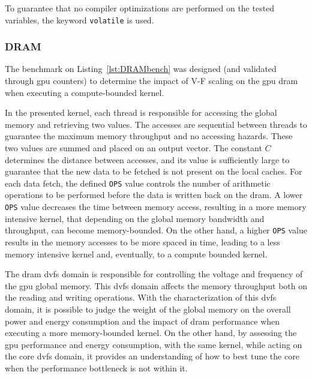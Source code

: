 To guarantee that no compiler optimizations are performed on the tested variables, the keyword \texttt{volatile} is used.


\subsubsection{DRAM}
\label{sec:DRAMbench_exp}

The benchmark on Listing~\ref{lst:DRAMbench} was designed (and validated through \acrshort{gpu} counters) to determine the impact of V-F scaling on the \acrshort{gpu} \acrshort{dram} when executing a compute-bounded kernel.

In the presented kernel, each thread is responsible for accessing the global memory and retrieving two values. The accesses are sequential between threads to guarantee the maximum memory throughput and no accessing hazards. 
These two values are summed and placed on an output vector. The constant $C$ determines the distance between accesses, and its value is sufficiently large to guarantee that the new data to be fetched is not present on the local caches.
For each data fetch, the defined \texttt{OPS} value controls the number of arithmetic operations to be performed before the data is written back on the \acrshort{dram}. A lower \texttt{OPS} value decreases the time between memory access, resulting in a more memory intensive kernel, that depending on the global memory bandwidth and throughput, can become memory-bounded. On the other hand, a higher \texttt{OPS} value results in the memory accesses to be more spaced in time, leading to a less memory intensive kernel and, eventually, to a compute bounded kernel.

The \acrshort{dram} \acrshort{dvfs} domain is responsible for controlling the voltage and frequency of the \acrshort{gpu} global memory. This \acrshort{dvfs} domain affects the memory throughput both on the reading and writing operations. With the characterization of this \acrshort{dvfs} domain, it is possible to judge the weight of the global memory on the overall power and energy consumption and the impact of \acrshort{dram} performance when executing a more memory-bounded kernel. On the other hand, by assessing the \acrshort{gpu} performance and energy consumption, with the same kernel, while acting on the core \acrshort{dvfs} domain, it provides an understanding of how to best tune the core when the performance bottleneck is not within it.

